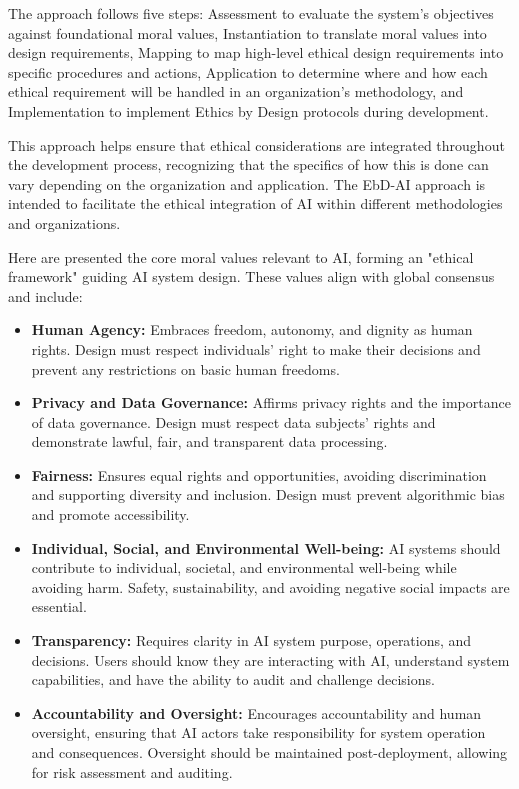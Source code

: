 \documentclass{article}
\begin{document}
The approach follows five steps: Assessment to evaluate the system's objectives against foundational moral values, Instantiation to translate moral values into design requirements, Mapping to map high-level ethical design requirements into specific procedures and actions, Application to determine where and how each ethical requirement will be handled in an organization's methodology, and Implementation to implement Ethics by Design protocols during development.  

This approach helps ensure that ethical considerations are integrated throughout the development process, recognizing that the specifics of how this is done can vary depending on the organization and application. The EbD-AI approach is intended to facilitate the ethical integration of AI within different methodologies and organizations.  

Here are presented the core moral values relevant to AI, forming an "ethical framework" guiding AI system design. These values align with global consensus and include:

\begin{itemize}

    \item \textbf{Human Agency:} Embraces freedom, autonomy, and dignity as human rights. Design must respect individuals' right to make their decisions and prevent any restrictions on basic human freedoms.

    \item \textbf{Privacy and Data Governance:} Affirms privacy rights and the importance of data governance. Design must respect data subjects' rights and demonstrate lawful, fair, and transparent data processing.

    \item \textbf{Fairness:} Ensures equal rights and opportunities, avoiding discrimination and supporting diversity and inclusion. Design must prevent algorithmic bias and promote accessibility.

    \item \textbf{Individual, Social, and Environmental Well-being:} AI systems should contribute to individual, societal, and environmental well-being while avoiding harm. Safety, sustainability, and avoiding negative social impacts are essential.

    \item \textbf{Transparency:} Requires clarity in AI system purpose, operations, and decisions. Users should know they are interacting with AI, understand system capabilities, and have the ability to audit and challenge decisions.

    \item \textbf{Accountability and Oversight:} Encourages accountability and human oversight, ensuring that AI actors take responsibility for system operation and consequences. Oversight should be maintained post-deployment, allowing for risk assessment and auditing.

\end{itemize}
\end{document}

